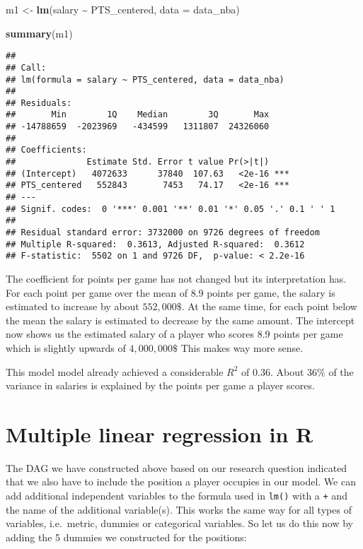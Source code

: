 \documentclass[
]{book}
\newenvironment{Shaded}{\begin{snugshade}}{\end{snugshade}}
\newcommand{\AttributeTok}[1]{\textcolor[rgb]{0.13,0.29,0.53}{#1}}
\newcommand{\FunctionTok}[1]{\textcolor[rgb]{0.13,0.29,0.53}{\textbf{#1}}}
\newcommand{\NormalTok}[1]{#1}
\newcommand{\OtherTok}[1]{\textcolor[rgb]{0.56,0.35,0.01}{#1}}
\newcommand{\SpecialCharTok}[1]{\textcolor[rgb]{0.81,0.36,0.00}{\textbf{#1}}}
\begin{document}
\begin{Shaded}
\begin{Highlighting}[]
\NormalTok{m1 }\OtherTok{\textless{}{-}} \FunctionTok{lm}\NormalTok{(salary }\SpecialCharTok{\textasciitilde{}}\NormalTok{ PTS\_centered, }\AttributeTok{data =}\NormalTok{ data\_nba)}

\FunctionTok{summary}\NormalTok{(m1)}
\end{Highlighting}
\end{Shaded}

\begin{verbatim}
## 
## Call:
## lm(formula = salary ~ PTS_centered, data = data_nba)
## 
## Residuals:
##       Min        1Q    Median        3Q       Max 
## -14788659  -2023969   -434599   1311807  24326060 
## 
## Coefficients:
##              Estimate Std. Error t value Pr(>|t|)    
## (Intercept)   4072633      37840  107.63   <2e-16 ***
## PTS_centered   552843       7453   74.17   <2e-16 ***
## ---
## Signif. codes:  0 '***' 0.001 '**' 0.01 '*' 0.05 '.' 0.1 ' ' 1
## 
## Residual standard error: 3732000 on 9726 degrees of freedom
## Multiple R-squared:  0.3613, Adjusted R-squared:  0.3612 
## F-statistic:  5502 on 1 and 9726 DF,  p-value: < 2.2e-16
\end{verbatim}

The coefficient for points per game has not changed but its interpretation has.
For each point per game over the mean of \(8.9\) points per game, the salary is
estimated to increase by about \(552,000\$\). At the same time, for each point
below the mean the salary is estimated to decrease by the same amount.
The intercept now shows us the estimated salary of a player who scores \(8.9\)
points per game which is slightly upwards of \(4,000,000\$\) This makes way more
sense.

This model model already achieved a considerable \(R^2\) of \(0.36\). About \(36\%\)
of the variance in salaries is explained by the points per game a player scores.

\hypertarget{multiple-linear-regression-in-r}{%
\section{Multiple linear regression in R}\label{multiple-linear-regression-in-r}}

The DAG we have constructed above based on our research question indicated that
we also have to include the position a player occupies in our model.
We can add additional independent variables to the formula used in \texttt{lm()} with a
\texttt{+} and the name of the additional variable(s). This works the same way for all
types of variables, i.e.~metric, dummies or categorical variables.
So let us do this now by adding the 5 dummies we constructed for the positions:
\end{document}

